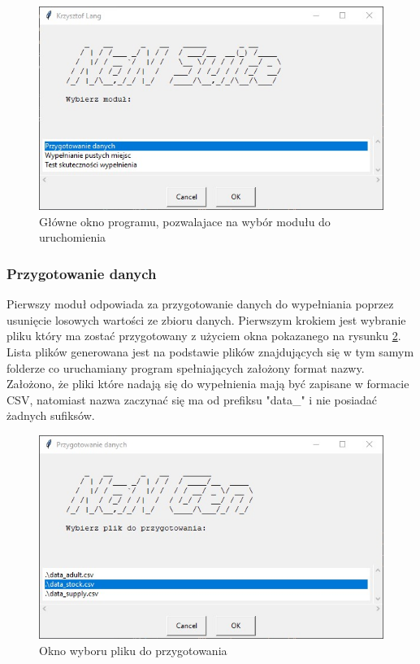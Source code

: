 \documentclass[12pt,twoside]{article}
\begin{document}
\begin{figure}[ht]
	\centering
	\includegraphics[width=12cm]{img/01.jpg}
	\caption{Główne okno programu, pozwalajace na wybór modułu do uruchomienia}
\label{Fig:main}
\end{figure}

\subsubsection{Przygotowanie danych}

Pierwszy moduł odpowiada za przygotowanie danych do wypełniania poprzez usunięcie losowych wartości ze zbioru danych.
Pierwszym krokiem jest wybranie pliku który ma zostać przygotowany
z użyciem okna pokazanego na rysunku \ref{Fig:gen_file}.
Lista plików generowana jest na podstawie plików znajdujących się
w tym samym folderze co uruchamiany program spełniających założony format nazwy.
Założono, że pliki które nadają się do wypełnienia mają być zapisane w formacie CSV,
natomiast nazwa zaczynać się ma od prefiksu "data\_" i nie posiadać żadnych sufiksów.

\begin{figure}[ht]
	\centering
	\includegraphics[width=12cm]{img/02.jpg}
	\caption{Okno wyboru pliku do przygotowania}
\label{Fig:gen_file}
\end{figure}
\end{document}
